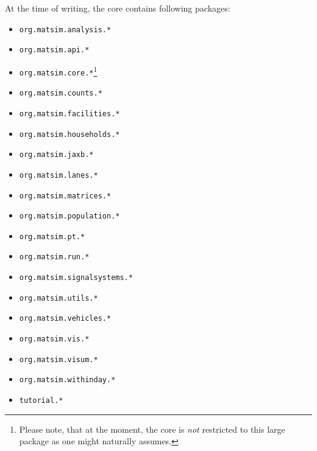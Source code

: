 At the time of writing, the core contains following packages:
\begin{itemize}\styleItemize
\item \lstinline{org.matsim.analysis.*}
\item \lstinline{org.matsim.api.*}
\item \lstinline{org.matsim.core.*}\footnote{Please note, that at the moment, the core is \emph{not} restricted to this large package as one might naturally assumes. }
\item \lstinline{org.matsim.counts.*}
\item \lstinline{org.matsim.facilities.*}
\item \lstinline{org.matsim.households.*}
\item \lstinline{org.matsim.jaxb.*}
\item \lstinline{org.matsim.lanes.*}
\item \lstinline{org.matsim.matrices.*}
\item \lstinline{org.matsim.population.*}
\item \lstinline{org.matsim.pt.*}
\item \lstinline{org.matsim.run.*}
\item \lstinline{org.matsim.signalsystems.*}
\item \lstinline{org.matsim.utils.*}
\item \lstinline{org.matsim.vehicles.*}
\item \lstinline{org.matsim.vis.*}
\item \lstinline{org.matsim.visum.*}
\item \lstinline{org.matsim.withinday.*}
\item \lstinline{tutorial.*}
\end{itemize}

 

